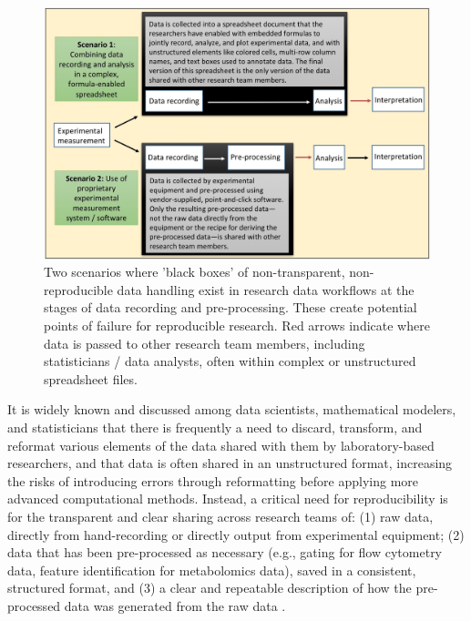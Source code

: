 \documentclass[]{tufte-book}
\begin{document}
\begin{figure}
\includegraphics[width=\textwidth]{figures/existing_blackboxes} \caption[Two scenarios where 'black boxes' of non-transparent, non-reproducible data handling exist in research data workflows at the stages of data recording and pre-processing]{Two scenarios where 'black boxes' of non-transparent, non-reproducible data handling exist in research data workflows at the stages of data recording and pre-processing. These create potential points of failure for reproducible research. Red arrows indicate where data is passed to other research team members, including statisticians / data analysts, often within complex or unstructured spreadsheet files.}\label{fig:workflow}
\end{figure}

It is widely known and discussed among data scientists, mathematical modelers,
and statisticians \citep{broman2018data, krishnan2016towards} that there is
frequently a need to discard, transform, and reformat various elements of the
data shared with them by laboratory-based researchers, and that data is often
shared in an unstructured format, increasing the risks of introducing errors
through reformatting before applying more advanced computational methods.
Instead, a critical need for reproducibility is for the transparent and clear
sharing across research teams of: (1) raw data, directly from hand-recording or
directly output from experimental equipment; (2) data that has been
pre-processed as necessary (e.g., gating for flow cytometry data, feature
identification for metabolomics data), saved in a consistent, structured format,
and (3) a clear and repeatable description of how the pre-processed data was
generated from the raw data \citep{broman2018data, ellis2018share}.
\end{document}
